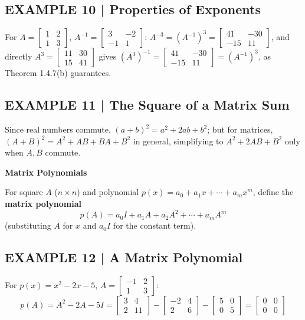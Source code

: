 \documentclass{article}
\newcommand{\redheading}[1]{{\vspace{2mm}\noindent\Large\bfseries\color{red!55!black} #1\par}\vspace{2mm}}
\theoremstyle{mystyle}
\begin{document}
\subsection*{EXAMPLE 10 | Properties of Exponents}
For $A=\begin{bmatrix}1&2\\1&3\end{bmatrix}$, $A^{-1}=\begin{bmatrix}3&-2\\-1&1\end{bmatrix}$: $A^{-3}=(A^{-1})^3=\begin{bmatrix}41&-30\\-15&11\end{bmatrix}$, and directly $A^3=\begin{bmatrix}11&30\\15&41\end{bmatrix}$ gives $(A^3)^{-1}=\begin{bmatrix}41&-30\\-15&11\end{bmatrix}=(A^{-1})^3$, as Theorem 1.4.7(b) guarantees.

\subsection*{EXAMPLE 11 | The Square of a Matrix Sum}
Since real numbers commute, $(a+b)^2=a^2+2ab+b^2$; but for matrices, $(A+B)^2=A^2+AB+BA+B^2$ in general, simplifying to $A^2+2AB+B^2$ only when $A,B$ commute.

\redheading{Matrix Polynomials}

For square $A$ ($n\times n$) and polynomial $p(x)=a_0+a_1x+\cdots+a_mx^m$, define the \textbf{matrix polynomial}
\[
p(A)=a_0I+a_1A+a_2A^2+\cdots+a_mA^m \tag{3}
\]
(substituting $A$ for $x$ and $a_0I$ for the constant term).

\subsection*{EXAMPLE 12 | A Matrix Polynomial}
For $p(x)=x^2-2x-5$, $A=\begin{bmatrix}-1&2\\1&3\end{bmatrix}$:
\[
p(A)=A^2-2A-5I=\begin{bmatrix}3&4\\2&11\end{bmatrix}-\begin{bmatrix}-2&4\\2&6\end{bmatrix}-\begin{bmatrix}5&0\\0&5\end{bmatrix}=\begin{bmatrix}0&0\\0&0\end{bmatrix}
\]
\end{document}
